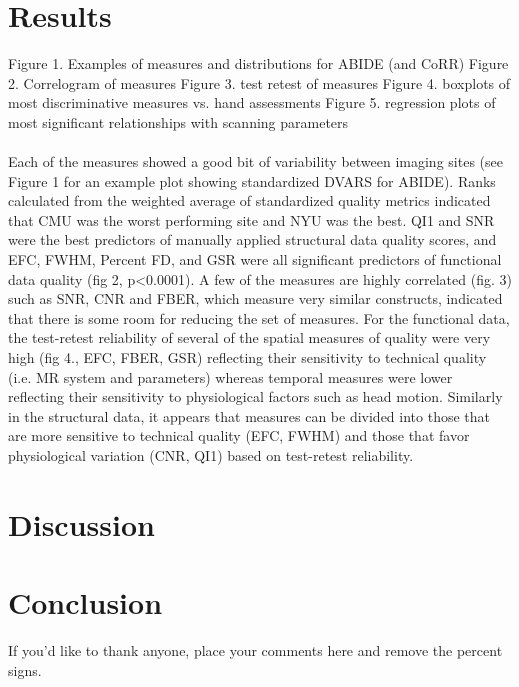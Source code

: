 \section{Results}
\label{sec:25}
Figure 1. Examples of measures and distributions for ABIDE (and CoRR)
Figure 2. Correlogram of measures
Figure 3. test retest of measures
Figure 4. boxplots of most discriminative measures vs. hand assessments
Figure 5. regression plots of most significant relationships with scanning parameters
\\\\
Each of the measures showed a good bit of variability between imaging sites (see Figure 1 for an example plot showing standardized DVARS for ABIDE). Ranks calculated from the weighted average of standardized quality metrics indicated that CMU was the worst performing site and NYU was the best. QI1 and SNR were the best predictors of manually applied structural data quality scores, and EFC, FWHM, Percent FD, and GSR were all significant predictors of functional data quality (fig 2, p<0.0001). A few of the measures are highly correlated (fig. 3) such as SNR, CNR and FBER, which measure very similar constructs, indicated that there is some room for reducing the set of measures. For the functional data, the test­-retest reliability of several of the spatial measures of quality were very high (fig 4., EFC, FBER, GSR) reflecting their sensitivity to technical quality (i.e. MR system and parameters) whereas temporal measures were lower reflecting their sensitivity to physiological factors such as head motion. Similarly in the structural data, it appears that measures can be divided into those that are more sensitive to technical quality (EFC, FWHM) and those that favor physiological variation (CNR, QI1) based on test­-retest reliability.
\section{Discussion}
\label{sec:26}
\section{Conclusion}
\label{sec:27}
\begin{acknowledgements}
If you'd like to thank anyone, place your comments here
and remove the percent signs.
\end{acknowledgements}


%
%

%
